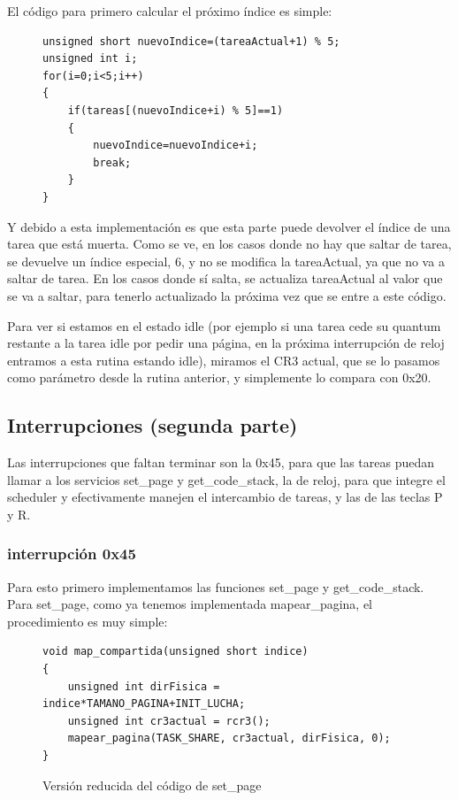 \documentclass[10pt, a4paper]{article}
\begin{document}
El código para primero calcular el próximo índice es simple:
\begin{figure}[H]
\begin{center}
\begin{verbatim}
unsigned short nuevoIndice=(tareaActual+1) % 5;
unsigned int i;
for(i=0;i<5;i++)
{
	if(tareas[(nuevoIndice+i) % 5]==1)
	{
		nuevoIndice=nuevoIndice+i;
		break;
	}
}
\end{verbatim}
\end{center}
\end{figure}
Y debido a esta implementación es que esta parte puede devolver el índice de una tarea que está muerta.
Como se ve, en los casos donde no hay que saltar de tarea, se devuelve un índice especial, 6, y no se modifica la tareaActual, ya que no va a saltar de tarea. En los casos donde sí salta, se actualiza tareaActual al valor que se va a saltar, para tenerlo actualizado la próxima vez que se entre a este código.

Para ver si estamos en el estado idle (por ejemplo si una tarea cede su quantum restante a la tarea idle por pedir una página, en la próxima interrupción de reloj entramos a esta rutina estando idle), miramos el CR3 actual, que se lo pasamos como parámetro desde la rutina anterior, y simplemente lo compara con 0x20.

\subsection{Interrupciones (segunda parte)}
Las interrupciones que faltan terminar son la 0x45, para que las tareas puedan llamar a los servicios set\_page y get\_code\_stack, la de reloj, para que integre el scheduler y efectivamente manejen el intercambio de tareas, y las de las teclas P y R.

\subsubsection*{interrupción 0x45}
Para esto primero implementamos las funciones set\_page y get\_code\_stack. Para set\_page, como ya tenemos implementada mapear\_pagina, el procedimiento es muy simple:

\begin{figure}[!h]
\begin{center}
\begin{verbatim}
void map_compartida(unsigned short indice)
{	
	unsigned int dirFisica = indice*TAMANO_PAGINA+INIT_LUCHA;
	unsigned int cr3actual = rcr3();
	mapear_pagina(TASK_SHARE, cr3actual, dirFisica, 0);	
}
\end{verbatim}
\caption{Versión reducida del código de set\_page}
\end{center}
\end{figure}
\end{document}

